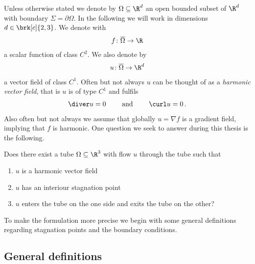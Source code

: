 Unless otherwise stated we denote by $\Omega\subseteq\R^d$ an open bounded subset of $\R^d$ with boundary $\Sigma=\partial\Omega$.
In the following we will work in dimensions $d\in\brk[c]{2,3}$.
We denote with
\begin{align*}
  f\colon\overline{\Omega}\to\R
\end{align*}
a scalar function of class $C^2$.
We also denote by
\begin{align*}
  u\colon\overline{\Omega}\to\R^d
\end{align*}
a vector field of class $C^1$.
Often but not always $u$ can be thought of as 
a \emph{harmonic vector field}, that is $u$ is of type $C^1$ and fulfils
\begin{align*}
  \diver u=0 \qquad \text{ and }\qquad \curl u=0\,.
\end{align*}
Also often but not always we assume that globally $u=\nabla f$ is a gradient field, implying that $f$ is harmonic.
One question we seek to answer during this thesis is the following.
\begin{question}\label{qu:flowthroughStagnationPoint}
  Does there exist a tube $\Omega\subseteq\R^3$ with flow $u$ through the tube such that
  \begin{enumerate}
    \item $u$ is a harmonic vector field
    \item $u$ has an interiour stagnation point
    \item $u$ enters the tube on the one side and exits the tube on the other?
  \end{enumerate}
\end{question}
To make the formulation more precise we begin with some general definitions regarding stagnation points and the boundary conditions.


\subsection{General definitions}

